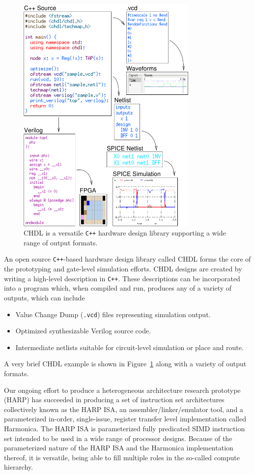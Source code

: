 \begin{figure}[h!]
  \centering
  \includegraphics[width=3.5in]{fig/chdl}
  \caption{CHDL is a versatile \texttt{C++} hardware design library supporting a wide range of output formats.}
  \label{fig:chdl}
\end{figure}

An open source \texttt{C++}-based hardware design library called CHDL \cite{chdl} forms the core of the prototyping and gate-level simulation efforts.
CHDL designs are created by writing a high-level description in \texttt{C++}.
These descriptions can be incorporated into a program which, when compiled and run, produces any of a variety of outputs, which can include
\begin{itemize}
  \item Value Change Dump (\texttt{.vcd}) files representing simulation output.
  \item Optimized synthesizable Verilog source code.
  \item Intermediate netlists suitable for circuit-level simulation or place and route.
\end{itemize}
A very brief CHDL example is shown in Figure~\ref{fig:chdl} along with a variety of output formats.

Our ongoing effort to produce a heterogeneous architecture research prototype (HARP) has succeeded in producing a set of instruction set architectures collectively known as the HARP ISA, an assembler/linker/emulator tool, and a parameterized in-order, single-issue, register transfer level implementation called Harmonica.
The HARP ISA is parameterized fully predicated SIMD instruction set intended to be used in a wide range of processor designs.
Because of the parameterized nature of the HARP ISA and the Harmonica implementation thereof, it is versatile, being able to fill multiple roles in the so-called compute hierarchy.

